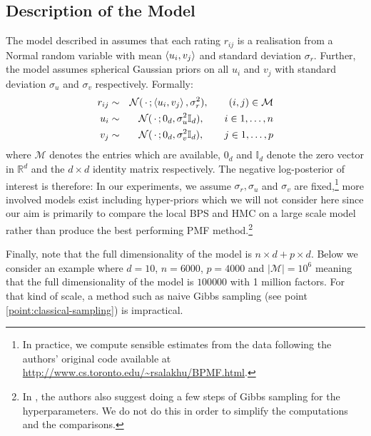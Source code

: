 \subsection{Description of the  Model}

The model described in \citep{mnih08} assumes that each rating $r_{ij}$ is a realisation from a Normal random variable with mean $\left\langle u_{i}, v_{j} \right\rangle$ and standard deviation $\sigma_{r}$. 
Further, the model assumes spherical Gaussian priors on all $u_{i}$ and $v_{j}$ with standard deviation $\sigma_{u}$ and $\sigma_{v}$ respectively. Formally:
%
\begin{eqnarray}
	r_{ij} &\sim& \mathcal N(\,\cdot\, ; \left\langle u_{i}, v_{j} \right\rangle, \sigma_{r}^{2}), \qquad (i,j)\in\mathcal M\nonumber\\
	u_{i} &\sim& \mathcal N(\,\cdot\, ; 0_{d}, \sigma_{u}^{2}\mathbb I_{d}), \qquad i\in 1,\dots,n \label{eq:pmf-model}\\
	v_{j} &\sim& \mathcal N(\,\cdot\, ; 0_{d}, \sigma_{v}^{2}\mathbb I_{d}), \qquad j\in 1,\dots,p\nonumber
\end{eqnarray}
%
where $\mathcal M$ denotes the entries which are available, $0_{d}$ and $\mathbb I_{d}$ denote the zero vector in $\mathbb R^{d}$ and the $d\times d$ identity matrix respectively. 
The negative log-posterior of interest is therefore:
%
%
In our experiments, we assume $\sigma_{r}, \sigma_{u}$ and $\sigma_{v}$ are fixed,\footnote{In practice, we compute sensible estimates from the data following the authors' original code available at \url{http://www.cs.toronto.edu/~rsalakhu/BPMF.html}.} more involved models exist including hyper-priors which we will not consider here since our aim is primarily to compare the local BPS and HMC on a large scale model rather than produce the best performing PMF method.\footnote{In \citep{mnih08}, the authors also suggest doing a few steps of Gibbs sampling for the hyperparameters. We do not do this in order to simplify the computations and the comparisons.}

Finally, note that the full dimensionality of the model is $n\times d + p\times d$. Below we consider an example where $d=10$, $n=6000$, $p=4000$ and $|\mathcal M|=10^{6}$ meaning that the full dimensionality of the model is $100 000$ with 1 million factors. For that kind of scale, a method such as naive Gibbs sampling (see point \ref{point:classical-sampling}) is impractical. 


